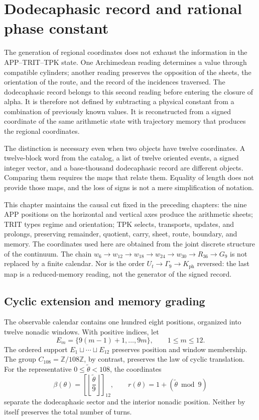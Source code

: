 \section{Dodecaphasic record and rational phase constant}
\label{sec:k-registro}

The generation of regional coordinates does not exhaust the information in the
APP--TRIT--TPK state. One Archimedean reading determines a value through
compatible cylinders; another reading preserves the opposition of the sheets, the
orientation of the route, and the record of the incidences traversed. The
dodecaphasic record belongs to this second reading before entering the
closure of alpha. It is therefore not defined by subtracting a physical constant from
a combination of previously known values. It is reconstructed from a
signed coordinate of the same arithmetic state with trajectory memory that produces the regional
coordinates.

The distinction is necessary even when two objects have twelve
coordinates. A twelve-block word from the catalog, a list of twelve
oriented events, a signed integer vector, and a base-thousand dodecaphasic record are
different objects. Comparing them requires the maps that
relate them. Equality of length does not provide those maps, and
the loss of signs is not a mere simplification of notation.

This chapter maintains the causal cut fixed in the preceding chapters:
the nine APP positions on the horizontal and vertical axes produce the
arithmetic sheets; TRIT types regime and orientation; TPK selects,
transports, updates, and prolongs, preserving remainder, quotient, carry,
sheet, route, boundary, and memory. The coordinates used here are obtained
from the joint discrete structure of the continuum. The chain
\(w_6\to w_{12}\to w_{18}\to w_{24}\to w_{30}\to R_{36}\to G_9\)
is not replaced by a finite calendar. Nor is the order
\(U_t\to\Gamma_9\to K_{\mathrm{ph}}\) reversed: the last map is a
reduced-memory reading, not the generator of the signed record.



\subsection{Cyclic extension and memory grading}
\label{subsec:k-calendario}

The observable calendar contains one hundred eight positions, organized into
twelve nonadic windows. With positive indices, let
\[
 E_m=\{9(m-1)+1,\ldots,9m\},\qquad 1\leq m\leq12.
\]
The ordered support \(E_1\sqcup\cdots\sqcup E_{12}\) preserves position and
window membership. The group \(C_{108}=\mathbb Z/108\mathbb Z\), by contrast,
preserves the law of cyclic translation. For the representative
\(0\leq\widetilde\theta<108\), the coordinates
\[
 \beta(\theta)=\left[\left\lfloor\frac{\widetilde\theta}{9}\right\rfloor\right]_{12},
 \qquad r(\theta)=1+(\widetilde\theta\bmod9)
\]
separate the dodecaphasic sector and the interior nonadic position. Neither
by itself preserves the total number of turns.

